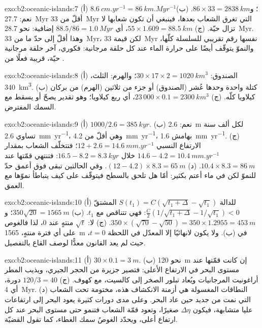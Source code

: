 \begin{solution}{exo:b2:oceanic-islands:7}
(أ) $\qty{8.6}{cm.yr^{-1}} = \qty{86}{km.Myr^{-1}}$؛ و$86\times33 = \qty{2838}{km}$. (ب) نعم:
\qty{27.7}{Myr} أقلّ من \qty{33}{Myr} التي تغرق الشعاب بعدها، فينبغي أن تكون شعابها
لا تزال حيّة. (ج) $55\times1.609 = \qty{88.5}{km}$، أي $88.5/86 = \qty{1.0}{Myr}$ إضافية: نحو
\qty{28.7}{Myr}. وهذا أقلّ إلى حدّ ما من \qty{33}{Myr}، لكن قيمة \qty{33}{Myr} نفسها رقم
تقريبي للسلسلة كلّها، والنموّ يتوقّف أيضًا على حرارة الماء عند كل
حلقة مرجانية: فكوري، آخر حلقة مرجانية حيّة، قريبة فعلًا من .
\end{solution}

\begin{solution}{exo:b2:oceanic-islands:8}
(أ) الصندوق: $30\times17\times2 = \qty{1020}{km^3}$؛ والهرم: الثلث، \qty{340}{km^3}. (ب) كتلة واحدة
وحدها عُشر (الصندوق) أو جزء من ثلاثين (الهرم) من بركان كيلاويا كلّه. (ج) $23\,000\times
0.1 = \qty{2300}{km^3}$، أي ربع كيلاويا؛ وهو تقدير يصحّ أو يسقط مع السمك
المفترض.
\end{solution}

\begin{solution}{exo:b2:oceanic-islands:9}
(أ) $1000/2.6 = \qty{385}{kyr}$. (ب) نعم: \qty{2.6}{m} لكل ألف سنة تساوي
\qty{2.6}{mm.yr^{-1}}، وهي أقلّ من \qty{4.2}{mm.yr^{-1}}، بهامش \qty{1.6}{mm.yr^{-1}}.
(ج) الارتفاع النسبي $12 + 2.6 = \qty{14.6}{mm.yr^{-1}}$؛ فتتخلّف الشعاب بمقدار $14.6 - 4.2 =
\qty{10.4}{mm.yr^{-1}}$ خلال $16.5 - 8.2 = \qty{8.3}{kyr}$: فتنتهي قمّتها عند $10.4\times8.3 =
\qty{86}{m}$. (د) $(12 - 4.2)\times8.3 = \qty{65}{m}$. وفي الحالتين تبقى فوق أعمق
حدّ للنموّ لكن في ماء أعتم بكثير: أمّا هل تلحق بالسطح فيتوقّف على كيف يتباطأ نموّها مع
العمق.
\end{solution}

\begin{solution}{exo:b2:oceanic-islands:10}
(أ) للدالة $S(t_1) = C(\sqrt{t_1 + \Delta} - \sqrt{t_1})$ المشتقّ $\frac C2(1/\sqrt{t_1 +
\Delta} - 1/\sqrt{t_1}) < 0$: فهي تتناقص مع $t_1$. (ب) $350\sqrt{20} = \qty{1565}{m}$؛ و$350\times
(\sqrt{70} - \sqrt{50}) = 350\times1.2955 = \qty{453}{m}$. (ج) لا: $\sqrt t$ منتهٍ عند $0$، لذا
فالغوص على أي فترة منتهٍ، \qty{1565}{m} في (ب). ولا يكون لانهائيًا إلا المعدّل في اللحظة $t = 0$،
حيث لم يعد القانون معدًّا لوصف القاع بالتفصيل.
\end{solution}

\begin{solution}{exo:b2:oceanic-islands:11}
(أ) $30\times0.1 = \qty{3}{m}$. (ب) نحو \qty{120}{m} إن كانت قمّتها عند مستوى البحر في
الارتفاع الأعلى: فتصير  جزيرة من الحجر الجيري، ويذيب المطر أراغونيت المرجانيات
ويُعاد تبلور الصخر إلى كالسيت، مع كهوف. (ج) $120/3 = 40$ دورة، أي \qty{4}{Myr}. (د) النطاقات
المغسولة هي أزمنة الانكشاف هذه، مختومة تحت الشعاب التي نمت من جديد حين عاد البحر.
وعلى مدى دورات كثيرة يعود البحر إلى ارتفاعات عليا متشابهة، فيكون $\Delta\eta$ صغيرًا، وتعود قمّة الشعاب
فتنمو حتى مستوى البحر عند كل ارتفاع أعلى، ويحدّد الغوصُ سمك الغطاء، كما تقول
القضيّة.
\end{solution}

